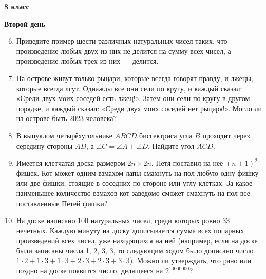 \documentclass{article}
\begin{document}
\large
	
\begin{center}
	\LARGE\textbf{8 класс}
\end{center}
\begin{center}
	\large\textbf{Второй день}
\end{center}


\begin{enumerate}[label*=8.{\arabic{enumi}}]
\setcounter{enumi}{5}
\item Приведите пример шести различных натуральных чисел таких, что произведение любых двух из них не делится на сумму всех чисел, а произведение любых трех из них — делится.

\item На острове живут только рыцари, которые всегда говорят правду, и лжецы, которые всегда лгут. Однажды все они сели по кругу, и каждый сказал: «Среди двух моих соседей есть лжец!». Затем они сели по кругу в другом порядке, и каждый сказал: «Среди двух моих соседей нет рыцаря!». Могло ли на острове быть 2023 человека?

\item В выпуклом четырёхугольнике $ABCD$ биссектриса угла $B$ проходит через середину стороны $AD$, а $\angle C = \angle A+\angle D$. Найдите угол $ACD$.

\item Имеется клетчатая доска размером $2n\times 2n$. Петя поставил на неё $(n+1)^2$ фишек. Кот может одним взмахом лапы смахнуть на пол любую одну фишку или две фишки, стоящие в соседних по стороне или углу клетках. За какое наименьшее количество взмахов кот заведомо сможет смахнуть на пол все поставленные Петей фишки?

\item На доске написано 100 натуральных чисел, среди которых ровно 33 нечетных. Каждую минуту на доску дописывается сумма всех попарных произведений всех чисел, уже находящихся на ней (например, если на доске были записаны числа 1, 2, 3, 3, то следующим ходом было дописано число $1\cdot 2+1\cdot 3+1\cdot 3+2\cdot 3+2\cdot 3+3\cdot 3$). Можно ли утверждать, что рано или поздно на доске появится число, делящееся на $2^{10000000}$?

\end{enumerate}
\end{document}
